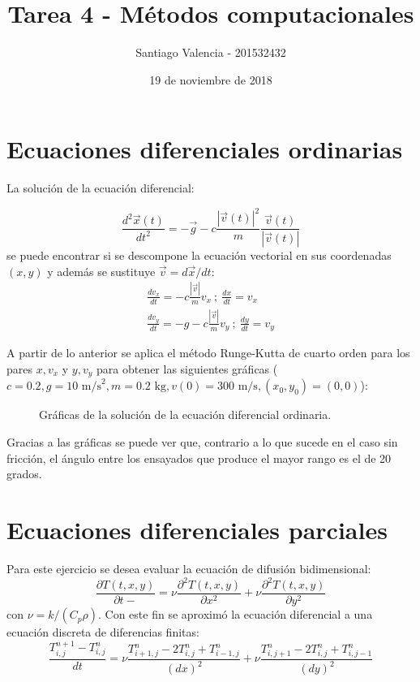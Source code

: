 \documentclass{article}
\title{Tarea 4 - Métodos computacionales}
\author{Santiago Valencia - 201532432}
\date{19 de noviembre de 2018}
\begin{document}
\maketitle

\section*{Ecuaciones diferenciales ordinarias}

La solución de la ecuación diferencial:

\begin{equation*}
    \frac{d^2\vec{x}(t)}{dt^2} = -\vec{g} - c\frac{|\vec{v}(t)|^2}{m}\frac{\vec{v}(t)}{|\vec{v}(t)|}
\end{equation*}
se puede encontrar si se descompone la ecuación vectorial en sus coordenadas $(x, y)$ y además se sustituye $\vec{v} = d\vec{x}/dt$:
\begin{gather*}
    \frac{dv_x}{dt} = -c\frac{|\vec{v}|}{m}v_x \ ; \ \frac{dx}{dt} = v_x \\
    \frac{dv_y}{dt} = -g - c\frac{|\vec{v}|}{m}v_y \ ; \ \frac{dy}{dt} = v_y
\end{gather*}

A partir de lo anterior se aplica el método Runge-Kutta de cuarto orden para los pares $x, v_x$ y $y, v_y$ para obtener las siguientes gráficas ($c = 0.2, g = 10 \text{ m/s}^2, m = 0.2 \text{ kg}, v(0) = 300 \text{ m/s}, (x_0, y_0) = (0, 0)$):

\begin{figure}[h]
\centering
    \caption{Gráficas de la solución de la ecuación diferencial ordinaria.}
    \label{fig:ODEs}
\end{figure}

Gracias a las gráficas se puede ver que, contrario a lo que sucede en el caso sin fricción, el ángulo entre los ensayados que produce el mayor rango es el de 20 grados.


\section*{Ecuaciones diferenciales parciales}

Para este ejercicio se desea evaluar la ecuación de difusión bidimensional:
\begin{equation*}
\frac{\partial T(t, x, y)}{\partial t-} = \nu \frac{\partial^2 T(t, x, y)}{\partial x^2} + \nu \frac{\partial^2 T(t, x, y)}{\partial y^2}
\end{equation*}
con $\nu = k/(C_p\rho)$. Con este fin se aproximó la ecuación diferencial a una ecuación discreta de diferencias finitas:
\begin{equation*}
\frac{T_{i, j}^{n+1} - T_{i, j}^{n}}{dt} = \nu\frac{T^n_{i+1, j} -2T^n_{i, j}+T^n_{i-1, j}}{(dx)^2} + \nu\frac{T^n_{i, j+1} -2T^n_{i, j}+T^n_{i, j-1}}{(dy)^2}
\end{equation*}
\end{document}
